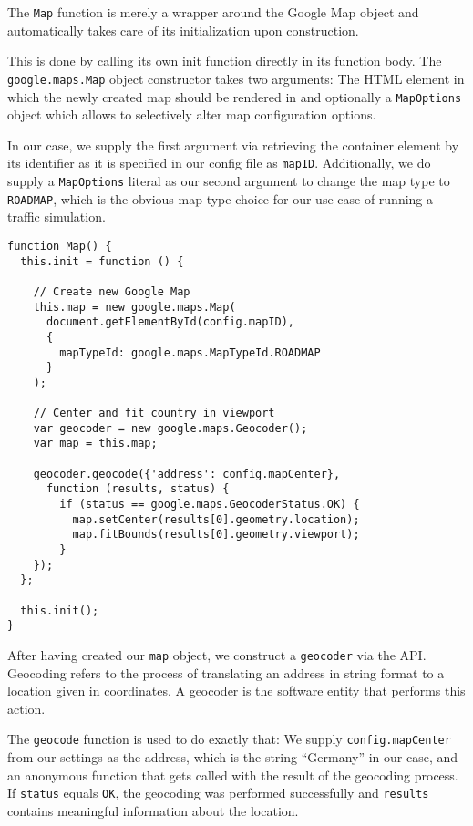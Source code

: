 The \texttt{Map} function is merely a wrapper around the Google Map object and automatically takes care of its initialization upon construction.

This is done by calling its own init function directly in its function body. The \texttt{google.maps.Map} object constructor takes two arguments: The HTML element in which the newly created map should be rendered in and optionally a \texttt{MapOptions} object which allows to selectively alter map configuration options.

In our case, we supply the first argument via retrieving the container element by its identifier as it is specified in our config file as \texttt{mapID}. Additionally, we do supply a \texttt{MapOptions} literal as our second argument to change the map type to \texttt{ROADMAP}, which is the obvious map type choice for our use case of running a traffic simulation.

\begin{verbatim}
function Map() {
  this.init = function () {

    // Create new Google Map
    this.map = new google.maps.Map(
      document.getElementById(config.mapID),
      {
        mapTypeId: google.maps.MapTypeId.ROADMAP
      }
    );

    // Center and fit country in viewport
    var geocoder = new google.maps.Geocoder();
    var map = this.map;

    geocoder.geocode({'address': config.mapCenter},
      function (results, status) {
        if (status == google.maps.GeocoderStatus.OK) {
          map.setCenter(results[0].geometry.location);
          map.fitBounds(results[0].geometry.viewport);
        }
    });
  };

  this.init();
}
\end{verbatim}

After having created our \texttt{map} object, we construct a \texttt{geocoder} via the API. Geocoding refers to the process of translating an address in string format to a location given in coordinates. A geocoder is the software entity that performs this action.

The \texttt{geocode} function is used to do exactly that: We supply \texttt{config.mapCenter} from our settings as the address, which is the string ``Germany'' in our case, and an anonymous function that gets called with the result of the geocoding process. If \texttt{status} equals \texttt{OK}, the geocoding was performed successfully and \texttt{results} contains meaningful information about the location.

